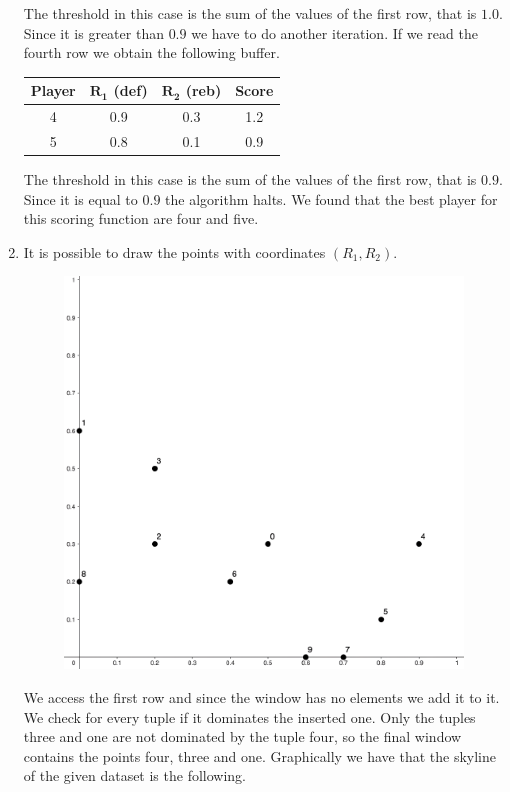 \begin{enumerate}
\begin{table}[H]
\begin{tabular}{c|cc|c}
            \end{tabular}
        \end{table}
        The threshold in this case is the sum of the values of the first row, that is $1.0$. Since it is greater than $0.9$ we have to do
        another iteration. If we read the fourth row we obtain the following buffer. 
        \begin{table}[H]
            \centering
            \begin{tabular}{c|cc|c}
            \hline
            \textbf{Player} & \textbf{$\boldsymbol{R_1}$ (def)} & \textbf{$\boldsymbol{R_2}$ (reb)} & \textbf{Score} \\ \hline
            4               & 0.9                               & 0.3                               & 1.2            \\
            5               & 0.8                               & 0.1                               & 0.9            \\ \hline
            \end{tabular}
        \end{table}
        The threshold in this case is the sum of the values of the first row, that is $0.9$. Since it is equal to $0.9$ the algorithm halts. 
        We found that the best player for this scoring function are four and five. 
    \item It is possible to draw the points with coordinates $(R_1,R_2)$. 
        \begin{figure}[H]
            \centering
            \includegraphics[width=0.35\linewidth]{images/skyline.png}
        \end{figure}
        We access the first row and since the window has no elements we add it to it. We check for every tuple if it dominates the inserted one. 
        Only the tuples three and one are not dominated by the tuple four, so the final window contains the points four, three and one. Graphically
        we have that the skyline of the given dataset is the following. 
        \begin{figure}[H]

\end{figure}
\end{enumerate}

